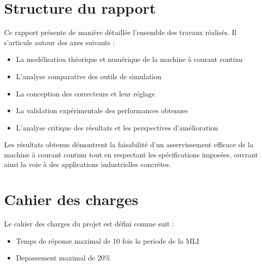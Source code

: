\section{Structure du rapport}

Ce rapport présente de manière détaillée l'ensemble des travaux réalisés. Il s'articule autour des axes suivants :
\begin{itemize}
    \item La modélisation théorique et numérique de la machine à courant continu
    \item L'analyse comparative des outils de simulation
    \item La conception des correcteurs et leur réglage
    \item La validation expérimentale des performances obtenues
    \item L'analyse critique des résultats et les perspectives d'amélioration
\end{itemize}

Les résultats obtenus démontrent la faisabilité d'un asservissement efficace de la machine à courant continu tout en respectant les spécifications imposées, ouvrant ainsi la voie à des applications industrielles concrètes.


\section{Cahier des charges}
Le cahier des charges du projet est défini comme suit :
\begin{itemize}
    \item Temps de réponse maximal de 10 fois la periode de la MLI
    \item Depassement maximal de 20\%
\end{itemize}

